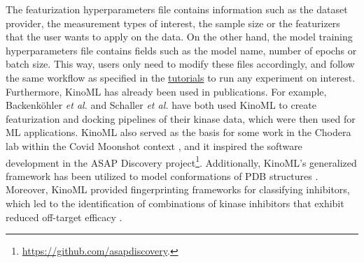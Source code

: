 \documentclass[9pt,lessons]{livecoms}
\begin{document}
The featurization hyperparameters file contains information such as the dataset provider, the measurement types of interest, the sample size or the featurizers that the user wants to apply on the data. On the other hand, the model training hyperparameters file contains fields such as the model name, number of epochs or batch size. This way, users only need to modify these files accordingly, and follow the same workflow as specified in the \href{https://github.com/openkinome/kinoml/tree/master/tutorials/experiments}{tutorials} to run any experiment on interest.\\

Furthermore, KinoML has already been used in  publications. For example, Backenk\"ohler \textit{et al.} \cite{backenkohler2023guided} and Schaller \textit{et al.} \cite{schaller2023benchmarking} have both used KinoML to create featurization and docking pipelines of their kinase data, which were then used for ML applications. 
KinoML also served as the basis for some work in the Chodera lab within the Covid Moonshot context \cite{Boby2023}, and it inspired the software development in the ASAP Discovery project\footnote{\href{https://github.com/asapdiscovery}{https://github.com/asapdiscovery}.}. Additionally, KinoML's generalized framework has been utilized to model conformations of PDB structures \cite{Perner2023}. Moreover, KinoML provided fingerprinting frameworks for classifying inhibitors, which led to the identification of combinations of kinase inhibitors that exhibit reduced off-target efficacy \cite{Outhwaite2023}.

\end{document}
